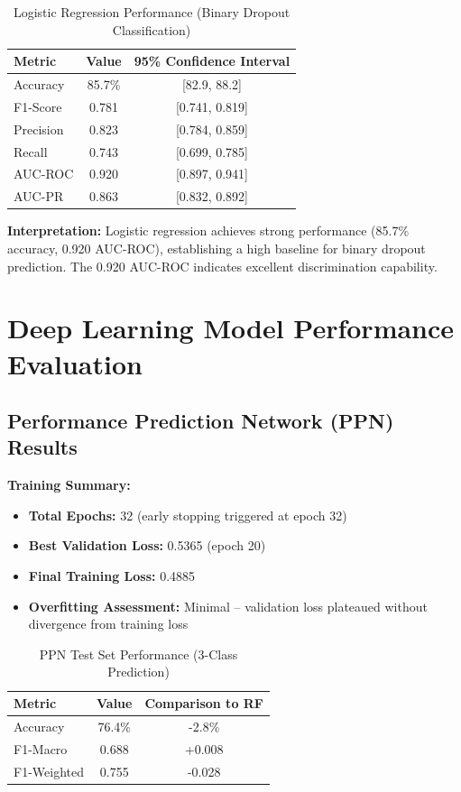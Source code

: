 \begin{table}[h]
\centering
\caption{Logistic Regression Performance (Binary Dropout Classification)}
\label{tab:lr_perf}
\begin{tabular}{lcc}
\toprule
\textbf{Metric} & \textbf{Value} & \textbf{95\% Confidence Interval} \\
\midrule
Accuracy & 85.7\% & [82.9, 88.2] \\
F1-Score & 0.781 & [0.741, 0.819] \\
Precision & 0.823 & [0.784, 0.859] \\
Recall & 0.743 & [0.699, 0.785] \\
AUC-ROC & 0.920 & [0.897, 0.941] \\
AUC-PR & 0.863 & [0.832, 0.892] \\
\bottomrule
\end{tabular}
\end{table}

\textbf{Interpretation:} Logistic regression achieves strong performance (85.7\% accuracy, 0.920 AUC-ROC), establishing a high baseline for binary dropout prediction. The 0.920 AUC-ROC indicates excellent discrimination capability.

\section{Deep Learning Model Performance Evaluation}

\subsection{Performance Prediction Network (PPN) Results}

\textbf{Training Summary:}
\begin{itemize}
\item \textbf{Total Epochs:} 32 (early stopping triggered at epoch 32)
\item \textbf{Best Validation Loss:} 0.5365 (epoch 20)
\item \textbf{Final Training Loss:} 0.4885
\item \textbf{Overfitting Assessment:} Minimal -- validation loss plateaued without divergence from training loss
\end{itemize}

\begin{table}[h]
\centering
\caption{PPN Test Set Performance (3-Class Prediction)}
\label{tab:ppn_perf}
\begin{tabular}{lcc}
\toprule
\textbf{Metric} & \textbf{Value} & \textbf{Comparison to RF} \\
\midrule
Accuracy & 76.4\% & -2.8\% \\
F1-Macro & 0.688 & +0.008 \\
F1-Weighted & 0.755 & -0.028 \\
\bottomrule
\end{tabular}
\end{table}

